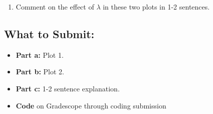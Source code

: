\documentclass{article}
\begin{document}
\begin{aprob}
\begin{enumerate}
        Note that in an ideal situation we would have an (FDR,TPR) pair in the upper left corner. We can always trivially achieve $(0,0)$ and $(\tfrac{d-k}{d},1)$.

        \item {} Comment on the effect of $\lambda$ in these two plots in 1-2 sentences.
  \end{enumerate}

  \subsection*{What to Submit:}
    \begin{itemize}
        \item \textbf{Part a:} Plot 1.
        \item \textbf{Part b:} Plot 2.
        \item \textbf{Part c:} 1-2 sentence explanation.
        \item \textbf{Code} on Gradescope through coding submission
    \end{itemize}
\end{aprob}
\end{document}

